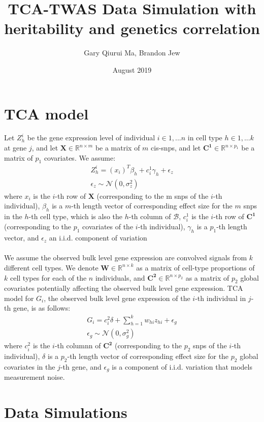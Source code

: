 \documentclass{article}
\title{TCA-TWAS Data Simulation with heritability and genetics correlation}
\author{Gary Qiurui Ma, Brandon Jew}
\date{August 2019}
\newcommand{\matr}[1]{\mathbf{#1}}
\begin{document}
\maketitle

\section{TCA model}
Let $Z^i_h$ be the gene expression level of individual $i \in {1,...n}$ in cell type $h \in 1,...k$ at gene $j$, and let $\matr{X}\in \mathbb{R}^{n\times m}$ be a matrix of $m$ cis-snps, and let $\matr{C^1}\in \mathbb{R}^{n\times p_1}$ be a matrix of $p_1$ covariates. We assume:
\begin{gather}
    Z^i_{h}=(x_i)^T\beta_{h}+c_i^1\gamma_{h}+\epsilon_z\\
    \epsilon_z \sim \mathcal{N}{(0,\sigma_z^2)} \nonumber
\end{gather}
where $x_i$ is the $i$-th row of $\matr{X}$ (corresponding to the m snps of the $i$-th individual), $\beta_{h}$ is a $m$-th length vector of corresponding effect size for the $m$ snps in the $h$-th cell type, which is also the $h$-th column of $\mathcal{B}$, $c_i^1$ is the $i$-th row of $\matr{C^1}$ (corresponding to the $p_1$ covariates of the $i$-th individual), $\gamma_h$ is a $p_1$-th length vector, and $\epsilon_z$ an i.i.d. component of variation\\\\
We assume the observed bulk level gene expression are convolved signals from $k$ different cell types. We denote $\matr{W}\in \mathbb{R}^{n\times k}$ as a matrix of cell-type proportions of $k$ cell types for each of the $n$ individuals, and $\matr{C^2}\in \mathbb{R}^{n\times p_2}$ as a matrix of $p_2$ global covariates potentially affecting the observed bulk level gene expression. TCA model for $G_i$, the observed bulk level gene expression of the $i$-th individual in $j$-th gene, is as follows:
\begin{gather}
    G_i=c^2_i\delta+\sum_{h=1}^{k}w_{hi}z_{hi}+\epsilon_{g}\\
    \epsilon_g \sim \mathcal{N}(0,\sigma_g^2) \nonumber
\end{gather}
where $c_i^2$ is the $i$-th columnn of $\matr{C^2}$ (corresponding to the $p_2$ snps of the $i$-th individual), $\delta$ is a $p_2$-th length vector of corresponding effect size for the $p_2$ global covariates in the $j$-th gene, and $\epsilon_g$ is a component of i.i.d. variation that models measurement noise.
\section{Data Simulations}
\end{document}
